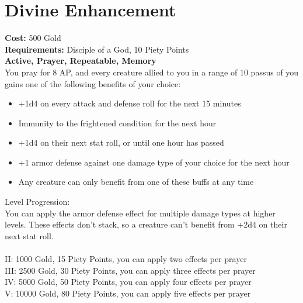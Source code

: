 \section{Divine Enhancement}
\textbf{Cost:} 500 Gold\\
\textbf{Requirements:} Disciple of a God, 10 Piety Points \\
\textbf{Active, Prayer, Repeatable, Memory}\\
You pray for 8 AP, and every creature allied to you in a range of 10 passus of you gains one of the following benefits of your choice:
\begin{itemize}
	\item +1d4 on every attack and defense roll for the next 15 minutes
	\item Immunity to the frightened condition for the next hour
	\item +1d4 on their next stat roll, or until one hour has passed
	\item +1 armor defense against one damage type of your choice for the next hour
	\item Any creature can only benefit from one of these buffs at any time
\end{itemize}

Level Progression:\\
You can apply the armor defense effect for multiple damage types at higher levels. These effects don't stack, so a creature can't benefit from +2d4 on their next stat roll.\\
\\
II: 1000 Gold, 15 Piety Points, you can apply two effects per prayer\\
III: 2500 Gold, 30 Piety Points, you can apply three effects per prayer\\
IV: 5000 Gold, 50 Piety Points, you can apply four effects per prayer\\
V: 10000 Gold, 80 Piety Points, you can apply five effects per prayer\\